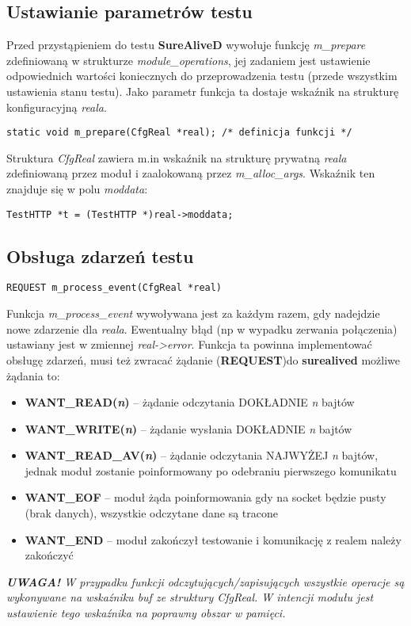 \documentclass[polish,12pt]{article}
\begin{document}
\subsection{Ustawianie parametrów testu}
Przed przystąpieniem do testu \textbf{SureAliveD} wywołuje funkcję \textit{m\_prepare} zdefiniowaną
w strukturze \textit{module\_operations}, jej zadaniem jest ustawienie odpowiednich wartości koniecznych
do przeprowadzenia testu (przede wszystkim ustawienia stanu testu). Jako parametr funkcja ta dostaje
wskaźnik na strukturę konfiguracyjną \textit{reala}.
\begin{verbatim}
static void m_prepare(CfgReal *real); /* definicja funkcji */
\end{verbatim}
Struktura \textit{CfgReal} zawiera m.in wskaźnik na strukturę prywatną \textit{reala} zdefiniowaną
przez moduł i zaalokowaną przez \textit{m\_alloc\_args}. Wskaźnik ten znajduje się w polu \textit{moddata}:
\begin{verbatim}
TestHTTP *t = (TestHTTP *)real->moddata;
\end{verbatim}

\newpage

\subsection{Obsługa zdarzeń testu}
\begin{verbatim}
REQUEST m_process_event(CfgReal *real)
\end{verbatim}
Funkcja \textit{m\_process\_event} wywoływana jest za każdym razem, gdy nadejdzie nowe zdarzenie dla
\textit{reala}.
\newline
Ewentualny błąd (np w wypadku zerwania połączenia) ustawiany jest w zmiennej \textit{real->error}.
Funkcja ta powinna implementować obsługę zdarzeń, musi też zwracać żądanie (\textbf{REQUEST})do \textbf{surealived}
możliwe żądania to:
\begin{itemize}
  \item \textbf{WANT\_READ(\textit{n})} -- żądanie odczytania DOKŁADNIE \textit{n} bajtów
  \item \textbf{WANT\_WRITE(\textit{n})} -- żądanie wysłania DOKŁADNIE \textit{n} bajtów
  \item \textbf{WANT\_READ\_AV(\textit{n})} -- żądanie odczytania NAJWYŻEJ \textit{n} bajtów, jednak moduł
    zostanie poinformowany po odebraniu pierwszego komunikatu
  \item \textbf{WANT\_EOF} -- moduł żąda poinformowania gdy na socket będzie pusty (brak danych),
    \newline wszystkie odczytane dane są tracone
  \item \textbf{WANT\_END} -- moduł zakończył testowanie i komunikację z realem należy zakończyć
\end{itemize}
\textit{\textbf{UWAGA!} W przypadku funkcji odczytujących/zapisujących wszystkie operacje
są wykonywane na wskaźniku \textit{buf} ze struktury CfgReal.
W intencji modułu jest ustawienie tego wskaźnika na poprawny obszar w pamięci.}
\end{document}
